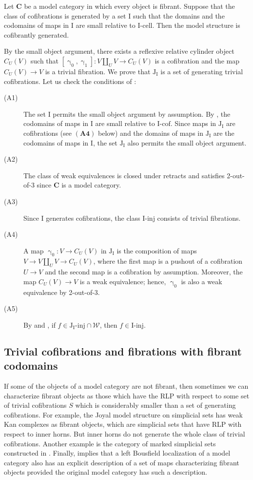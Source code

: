 \documentclass{tac}
\theoremstyle{definition}
\newcommand{\we}{\mathcal{W}}
\newcommand{\cat}[1]{\mathbf{#1}}
\newcommand{\C}{\cat{C}}
\newcommand{\I}{\mathrm{I}}
\newcommand{\J}{\mathrm{J}}
\newcommand{\class}[2]{#1\text{-}\mathrm{#2}}
\newcommand{\Iinj}[1][\I]{\class{#1}{inj}}
\newcommand{\Icell}[1][\I]{\class{#1}{cell}}
\newcommand{\Icof}[1][\I]{\class{#1}{cof}}
\newcommand{\Jinj}[1][]{\Iinj[\J#1]}
\newcommand{\cyli}{\upgamma}
\begin{document}
\begin{prop}
Let $\C$ be a model category in which every object is fibrant.
Suppose that the class of cofibrations is generated by a set $\I$ such that
the domains and the codomains of maps in $\I$ are small relative to $\Icell$.
Then the model structure is cofibrantly generated.
\end{prop}
\proof
By the small object argument, there exists a reflexive relative cylinder object $C_U(V)$ such that $[\cyli_0,\cyli_1] : V \amalg_U V \to C_U(V)$ is a cofibration and the map $C_U(V) \to V$ is a trivial fibration.
We prove that $\J_\I$ is a set of generating trivial cofibrations.
Let us check the conditions of :
\begin{description}
\item[(A1)] The set $\I$ permits the small object argument by assumption.
By \cite[Proposition~2.1.16]{hovey}, the codomains of maps in $\I$ are small relative to $\Icof$.
Since maps in $\J_\I$ are cofibrations (see $\mathbf{(A4)}$ below) and the domains of maps in $\J_\I$ are the codomains of maps in $\I$,
the set $\J_\I$ also permits the small object argument.
\item[(A2)] The class of weak equivalences is closed under retracts and satisfies 2-out-of-3 since $\C$ is a model category.
\item[(A3)] Since $\I$ generates cofibrations, the class $\Iinj$ consists of trivial fibrations.
\item[(A4)] A map $\cyli_0 : V \to C_U(V)$ in $\J_\I$ is the composition of maps $V \to V \amalg_U V \to C_U(V)$,
where the first map is a pushout of a cofibration $U \to V$ and the second map is a cofibration by assumption.
Moreover, the map $C_U(V) \to V$ is a weak equivalence; hence, $\cyli_0$ is also a weak equivalence by 2-out-of-3.
\item[(A5)] By  and , if $f \in \Jinj[_\I] \cap \we$, then $f \in \Iinj$.
\end{description}
\endproof

\subsection{Trivial cofibrations and fibrations with fibrant codomains}

If some of the objects of a model category are not fibrant, then sometimes we can characterize fibrant objects as those which have
the RLP with respect to some set of trivial cofibrations $S$ which is considerably smaller than a set of generating cofibrations.
For example, the Joyal model structure on simplicial sets has weak Kan complexes as fibrant objects,
which are simplicial sets that have RLP with respect to inner horns.
But inner horns do not generate the whole class of trivial cofibrations.
Another example is the category of marked simplicial sets constructed in \cite[Proposition~3.1.3.7]{lurie-topos}.
Finally, \cite[Lemma~3.3.11]{hirschhorn} implies that a left Bousfield localization of a model category
also has an explicit description of a set of maps characterizing fibrant objects provided the original model category has such a description.
\end{document}
